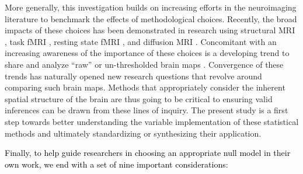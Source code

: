 \documentclass[12pt,aps,pra,reprint,showkeys]{revtex4-1}
\newcommand{\nimg}[1]{\textcolor{black}{{#1}}}
\begin{document}
More generally, this investigation builds on increasing efforts in the neuroimaging literature to benchmark the effects of methodological choices.
Recently, the broad impacts of these choices has been demonstrated in research using structural MRI \citep{bhagwat2020biorxiv, kharabian2020influence}, task fMRI \citep{carp2012plurality, botviniknesser2020nature}, resting state fMRI \citep{parkes2018neuroimage, ciric2017neuroimage}, and diffusion MRI \citep{oldham2020biorxiv, maier2017natcomm, schilling2019neuroimage}.
Concomitant with an increasing awareness of the importance of these choices is a developing trend to share and analyze ``raw'' or un-thresholded brain maps \citep{gorgolewski2015neurovault, witt2020biorxiv}.
Convergence of these trends has naturally opened new research questions that revolve around comparing such brain maps.
Methods that appropriately consider the inherent spatial structure of the brain are thus going to be critical to ensuring valid inferences can be drawn from these lines of inquiry.
The present study is a first step towards better understanding the variable implementation of these statistical methods and ultimately standardizing or synthesizing their application.

\nimg{Finally, to help guide researchers in choosing an appropriate null model in their own work, we end with a set of nine important considerations:}
\end{document}
